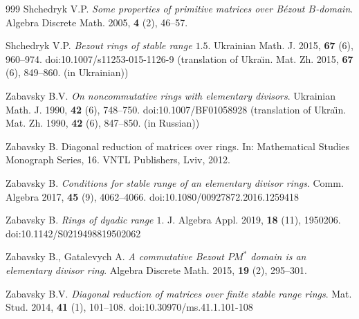 \documentclass[12pt,a4paper, reqno]{amsart}
\begin{document}
\begin{thebibliography}{999}
Shchedryk V.P. \textit{Some properties of primitive matrices over B\'ezout $B$-domain}.
Algebra Discrete Math. 2005, \textbf{4} (2), 46--57.

Shchedryk V.P. \textit{Bezout rings of stable range $1.5$}.
Ukrainian Math. J. 2015, \textbf{67} (6), 960--974. doi:10.1007/s11253-015-1126-9
(translation of Ukra\"{\i}n. Mat. Zh. 2015, \textbf{67} (6), 849--860. (in Ukrainian))

Zabavsky B.V. \textit{On noncommutative rings with elementary divisors}.
Ukrainian Math. J. 1990, \textbf{42} (6), 748--750. doi:10.1007/BF01058928
(translation of Ukra\"{\i}n. Mat. Zh. 1990, \textbf{42} (6), 847--850. (in Russian))

Zabavsky B. Diagonal reduction of matrices over rings.
In: Mathematical Studies Monograph Series, 16.
VNTL Publishers, Lviv, 2012.

Zabavsky B. \textit{Conditions for stable range of an elementary divisor rings}.
Comm. Algebra 2017, \textbf{45} (9), 4062--4066.
doi:10.1080/00927872.2016.1259418

Zabavsky B. \textit{Rings of dyadic range $1$}.
J. Algebra Appl. 2019, \textbf{18} (11), 1950206.
doi:10.1142/S0219498819502062

Zabavsky B., Gatalevych A. \textit{A commutative Bezout $PM^*$ domain is an elementary divisor ring}.
Algebra Discrete Math. 2015, \textbf{19} (2), 295--301.

Zabavsky B.V. \textit{Diagonal reduction of matrices over finite stable range rings}.
Mat. Stud. 2014, \textbf{41} (1), 101--108.
doi:10.30970/ms.41.1.101-108

\end{thebibliography}
\end{document}
